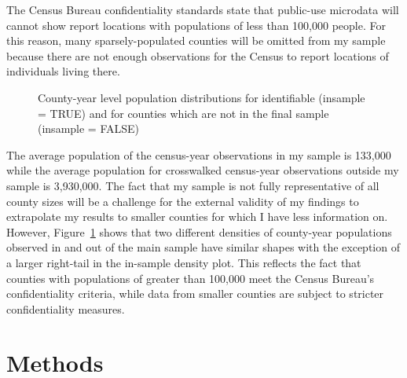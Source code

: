 \documentclass[12pt]{article}
\begin{document}
The Census Bureau confidentiality standards state that public-use
microdata will cannot show report locations with populations of less
than 100,000 people. For this reason, many sparsely-populated counties
will be omitted from my sample because there are not enough observations
for the Census to report locations of individuals living there.


\label{cell-fig-comparesamplepops}
\begin{figure}[H]
\caption{\label{fig-comparesamplepops}County-year level population
distributions for identifiable (insample = TRUE) and for counties which are not in the final sample (insample = FALSE)}
\end{figure}%

The average population of the census-year observations in my sample is
133,000 while the average population for
crosswalked census-year observations outside my sample is
3,930,000. The fact that my sample is not
fully representative of all county sizes will be a challenge for the
external validity of my findings to extrapolate my results to smaller
counties for which I have less information on. However,
Figure~\ref{fig-comparesamplepops} shows that two different densities of
county-year populations observed in and out of the main sample have
similar shapes with the exception of a larger right-tail in the
in-sample density plot. This reflects the fact that counties with
populations of greater than 100,000 meet the Census Bureau's
confidentiality criteria, while data from smaller counties are subject
to stricter confidentiality measures.

\section{Methods}\label{methods}
\end{document}
